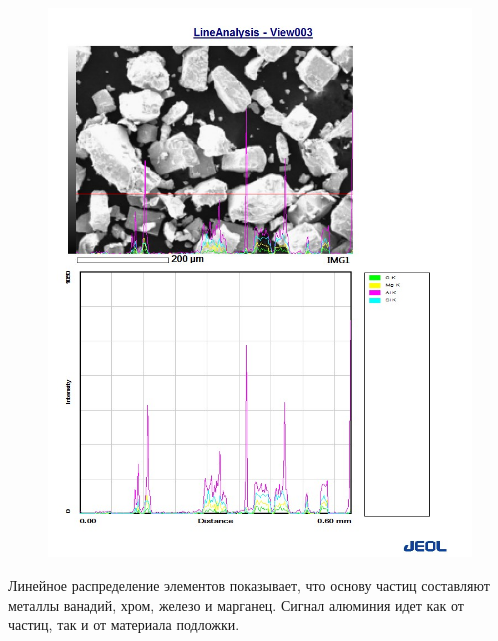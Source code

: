 \documentclass[12pt]{article}
\begin{document}
\begin{figure}[H]
	\includegraphics[width = 0.9\linewidth]{./pictures/line_spec_2.jpg}
\end{figure}

Линейное распределение элементов показывает, что основу частиц составляют металлы ванадий, хром, железо и марганец. Сигнал алюминия идет как от частиц, так и от материала подложки.
\end{document}
